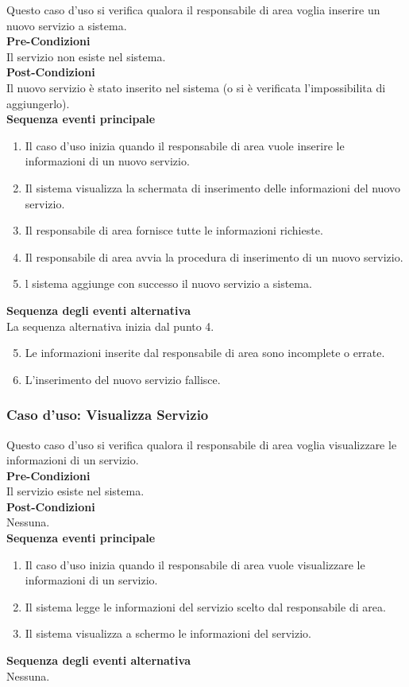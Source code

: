 \documentclass[green, fancy, 11pt]{elegantbook}
\begin{document}
Questo caso d’uso si verifica qualora il responsabile di area voglia inserire un nuovo servizio a sistema.\\
\textbf{Pre-Condizioni}\\
Il servizio non esiste nel sistema.\\
\textbf{Post-Condizioni}\\
Il nuovo servizio è stato inserito nel sistema (o si è verificata l’impossibilita di aggiungerlo).\\
\textbf{Sequenza eventi principale}
\begin{enumerate}
	\item Il caso d’uso inizia quando il responsabile di area vuole inserire le informazioni di un nuovo servizio.
	\item Il sistema visualizza la schermata di inserimento delle informazioni del nuovo servizio.
	\item Il responsabile di area fornisce tutte le informazioni richieste.
	\item Il responsabile di area avvia la procedura di inserimento di un nuovo servizio.
	\item l sistema aggiunge con successo il nuovo servizio a sistema.
\end{enumerate}
\textbf{Sequenza degli eventi alternativa}\\
La sequenza alternativa inizia dal punto 4.
\begin{enumerate}
	\setcounter{enumi}{4}
	\item Le informazioni inserite dal responsabile di area sono incomplete o errate.
	\item L’inserimento del nuovo servizio fallisce.
\end{enumerate}
\newpage

\subsubsection{Caso d'uso: Visualizza Servizio}

Questo caso d’uso si verifica qualora il responsabile di area voglia visualizzare le informazioni di un servizio.\\
\textbf{Pre-Condizioni}\\
Il servizio esiste nel sistema.\\
\textbf{Post-Condizioni}\\
Nessuna.\\
\textbf{Sequenza eventi principale}
\begin{enumerate}
	\item Il caso d’uso inizia quando il responsabile di area vuole visualizzare le informazioni di un servizio.
	\item Il sistema legge le informazioni del servizio scelto dal responsabile di area.
	\item Il sistema visualizza a schermo le informazioni del servizio.
\end{enumerate}
\textbf{Sequenza degli eventi alternativa}\\
Nessuna.
\end{document}
